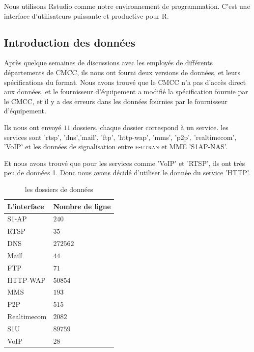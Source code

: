 Nous utilisons \textsf{Rstudio} comme notre environnement de programmation. C'est une interface d'utilisateurs puissante et productive pour R.

\subsection{Introduction des données}
Après quelque semaines de discussions avec les employés de différents départements de CMCC, ils nous ont fourni deux versions de données, et leurs spécifications du format\cite{specifi}. Nous avons trouvé que le CMCC n'a pas d'accès direct aux données, et le fournisseur d'équipement a modifié la spécification fournie par le CMCC, et il y a des erreurs dans les données fournies par le fournisseur d'équipement.

Ils nous ont envoyé $11$ dossiers, chaque dossier correspond à un service. les services sont 'rtsp', 'dns','mail', 'ftp', 'http-wap', 'mms', 'p2p', 'realtimecom', 'VoIP' et les données de signalisation entre \textsc{e-utran} et MME 'S1AP-NAS'.
    
Et nous avons trouvé que pour les services comme 'VoIP' et 'RTSP', ils ont très peu de données \ref{table.nombre}. Donc nous avons décidé d'utiliser le donnée du service 'HTTP'.

\begin{table}[H]
\centering
	\begin{tabular}{|>{\centering\arraybackslash}p{4 cm}|>{\centering\arraybackslash}p{4 cm}|}
	\hline \textsf{L'interface }& \textsf{Nombre de ligne} \\ 
	\hline S1-AP & $240$ \\ 
	\hline RTSP &$ 35$ \\ 
	\hline DNS  & $272562$ \\ 
	\hline Maill & $44$ \\ 
	\hline FTP &$ 71$ \\ 
	\hline HTTP-WAP & $50854$ \\ 
	\hline MMS & $193$ \\ 
	\hline P2P & $515$ \\ 
	\hline Realtimecom & $2082$ \\ 
	\hline S1U &$ 89759$ \\ 
	\hline VoIP & $28$ \\ 
	\hline 
	\end{tabular} 
	\caption{les dossiers de données}
	          \label{table.nombre}
\end{table}


